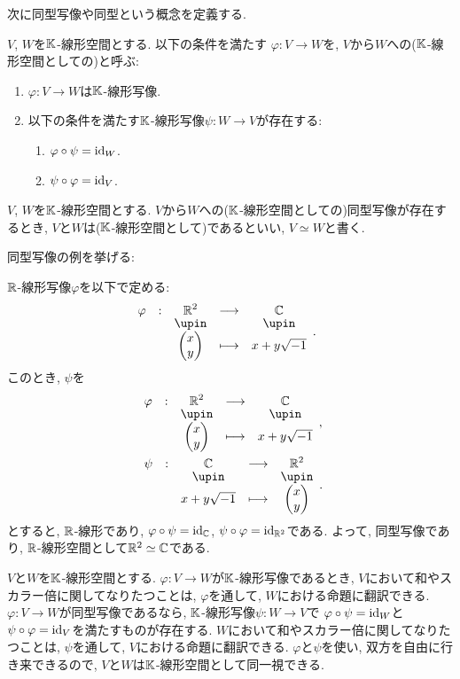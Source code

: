 次に同型写像や同型という概念を定義する.
\begin{definition}
  $V$, $W$を$\mathbb{K}$-線形空間とする.
  以下の条件を満たす
  $\varphi\colon V\to W$を,
  $V$から$W$への($\mathbb{K}$-線形空間としての)と呼ぶ:
  \begin{enumerate}
  \item $\varphi\colon V\to W$は$\mathbb{K}$-線形写像.
  \item 以下の条件を満たす$\mathbb{K}$-線形写像$\psi\colon W \to V$が存在する:
    \begin{enumerate}
      \item $\varphi\circ \psi=\operatorname{id}_W$.
      \item $\psi\circ \varphi=\operatorname{id}_V$.
    \end{enumerate}
  \end{enumerate}
\end{definition}
\begin{definition}
  $V$, $W$を$\mathbb{K}$-線形空間とする.
  $V$から$W$への($\mathbb{K}$-線形空間としての)同型写像が存在するとき,
  $V$と$W$は($\mathbb{K}$-線形空間として)であるといい,  
  $V\simeq W$と書く.
\end{definition}

同型写像の例を挙げる:
\begin{example}
  $\mathbb{R}$-線形写像$\varphi$を以下で定める:
  \begin{align*}
    &\shazo{\varphi}{\RR^2}{\CC}{\begin{pmatrix}x\\y\end{pmatrix}}{x+y\sqrt{-1}}.
  \end{align*}
  このとき,
  $\psi$を
  \begin{align*}
    &\shazo{\varphi}{\RR^2}{\CC}{\begin{pmatrix}x\\y\end{pmatrix}}{x+y\sqrt{-1}},\\
   &\shazo{\psi}{\CC}{\RR^2}{x+y\sqrt{-1}}{\begin{pmatrix}x\\y\end{pmatrix}}.
  \end{align*}
  とすると,
  $\mathbb{R}$-線形であり,
  $\varphi\circ \psi=\operatorname{id}_{\mathbb{C}}$,
  $\psi\circ\varphi=\operatorname{id}_{\mathbb{R}^2}$である.
  よって, 同型写像であり,
  $\mathbb{R}$-線形空間として$\mathbb{R}^2\simeq\mathbb{C}$である.
\end{example}



\begin{remark}
  $V$と$W$を$\mathbb{K}$-線形空間とする.
  $\varphi\colon V\to W$が$\mathbb{K}$-線形写像であるとき,
  $V$において和やスカラー倍に関してなりたつことは,
  $\varphi$を通して, $W$における命題に翻訳できる.
  $\varphi\colon V\to W$が同型写像であるなら,
  $\mathbb{K}$-線形写像$\psi\colon W\to V$で
  $\varphi\circ \psi=\operatorname{id}_W$と
  $\psi\circ \varphi=\operatorname{id}_V$を満たすものが存在する.
  $W$において和やスカラー倍に関してなりたつことは,
  $\psi$を通して, $V$における命題に翻訳できる.
  $\varphi$と$\psi$を使い, 双方を自由に行き来できるので,
  $V$と$W$は$\mathbb{K}$-線形空間として同一視できる.
\end{remark}

